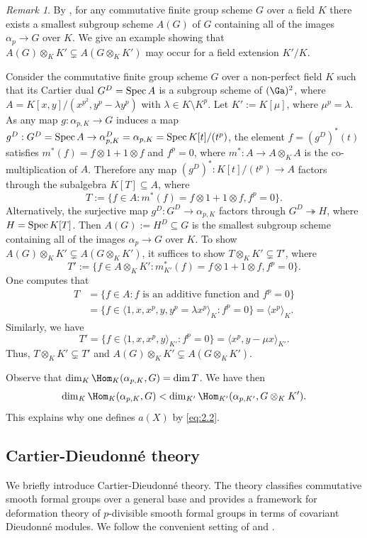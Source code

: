 \documentclass[]{amsart}
\theoremstyle{plain}
\theoremstyle{definition}
\theoremstyle{remark}
\newtheorem{remark}[thm]{Remark}
\def\Spec{{\rm Spec}\,}
\newcommand{\<}{\langle}   %
\renewcommand{\>}{\rangle} %
\newcommand{\dieu}{Dieudonn\'{e} }
\def\onto{\twoheadrightarrow}
\begin{document}
\begin{remark}
By \cite[Proposition 2.5]{li-oort}, for any commutative finite group scheme $G$ over a field $K$ there exists a smallest subgroup scheme $A(G)$ of $G$ containing all of the images $\alpha_p \to G$ over $K$. We give an example showing that $ A(G)\otimes_K K'\subsetneq A(G\otimes_K K')$ may occur for a field extension $K'/K$.

Consider the  commutative finite group scheme $G$ over a non-perfect field $K$ such that its Cartier dual $G^D=\Spec A$ is a subgroup scheme of $(\Ga)^2$, where $A=K[x,y]/(x^{p^2}, y^p-\lambda y^p)$ with $\lambda\in K \setminus K^p$. Let $K':=K[\mu]$, where $\mu^p=\lambda$. As any map $g: \alpha_{p,K} \to G$ induces a map $g^D: G^D=\Spec A \to \alpha_{p,K}^D=\alpha_{p,K}=\Spec K[t]/(t^p)$, the element $f=(g^D)^*(t)$ satisfies $m^*(f)=f\otimes 1+1\otimes f$ and $f^p=0$, where $m^*: A\to A\otimes_K A$ is the co-multiplication of $A$. Therefore any map $(g^D)^*: K[t]/(t^p)\to A$ factors through the subalgebra $K[T]\subseteq A$, where 
\[ T:=\{f\in A: m^*(f)=f\otimes 1+1\otimes f, f^p=0\}.\]
Alternatively, the surjective map $g^D: G^D \to \alpha_{p,K}$ factors through $G^D \onto H$, where $H=\Spec K[T]$. Then $A(G):=H^D\subseteq G$ is the smallest subgroup scheme containing all of the images $\alpha_p \to G$ over $K$.
To show $ A(G)\otimes_K K'\subsetneq A(G\otimes_K K')$, it suffices to show $T\otimes_K K' \subsetneq T'$, where 
\[ T':=\{f\in A\otimes_K K': m_{K'}^*(f)=f\otimes 1+1\otimes f, f^p=0\}.\]
One computes that
\[ \begin{split}
    T &=\{f\in A: f \text{ is an additive function and } f^p=0\} \\
      &=\{f\in \<1, x, x^p,y, y^p=\lambda x^p \>_K: f^p=0\}=\<x^p\>_K.
\end{split} \]
Similarly, we have 
\[ T'
   =\{f\in \<1, x, x^p,y \>_{K'}: f^p=0\}=\<x^p, y-\mu x \>_{K'}. \]
Thus, $T\otimes_K K' \subsetneq T'$ and $A(G)\otimes_K K'\subsetneq A(G\otimes_K K')$.  

Observe that $\dim_K \Hom_K(\alpha_{p,K},G)=\dim T$. We have then
\[ \dim_K \Hom_K(\alpha_{p,K},G) < \dim_{K'} \Hom_{K'} (\alpha_{p,K'},G\otimes_K K'). \]
This explains why one defines $a(X)$ by \eqref{eq:2.2}.
\end{remark}

\subsection{Cartier-\dieu theory} \label{sec:2.3}
We briefly introduce Cartier-\dieu theory. The theory classifies commutative smooth formal groups over a general base and provides a framework for deformation theory of $p$-divisible smooth formal groups in terms of covariant \dieu modules. 
We follow the convenient setting of \cite[Section 0]{norman:algo} and 
\cite[Section 2, p.~1011]{chai-norman:gamma2}.
\end{document}
